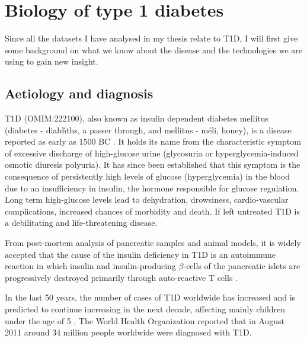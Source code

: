 \section{Biology of type 1 diabetes}

Since all the datasets I have analysed in my thesis relate to \gls{T1D}, I will first give some background on
what we know about the disease and the technologies we are using to gain new insight.

\subsection{Aetiology and diagnosis}

\Gls{T1D} (OMIM:222100), also known as insulin dependent diabetes mellitus (diabetes - \foreignlanguage{greek}{diab\'hths},
a passer through, and mellitus - \foreignlanguage{greek}{m\'eli}, honey), is a disease reported as early as $1500$ BC \citep{Poretsky:2010wr}.
It holds its name from the characteristic symptom of excessive discharge of high-glucose urine (glycosuria or hyperglycemia-induced osmotic diuresis polyuria).
It has since been established that this symptom is the consequence of persistently high levels of glucose (hyperglycemia) in the blood due to an insufficiency in insulin,
the hormone responsible for glucose regulation.
Long term high-glucose levels lead to dehydration, drowsiness, cardio-vascular complications, increased chances of morbidity and death.  
If left untreated T1D is a debilitating and life-threatening disease.

From post-mortem analysis of pancreatic samples and animal models,
it is widely accepted that the cause of the insulin deficiency in \gls{T1D} is an autoimmune reaction
in which insulin and insulin-producing $\beta$-cells of the pancreatic islets
are progressively destroyed primarily through auto-reactive T cells \citep{Todd:2010bl}.  

In the last 50 years, the number of cases of T1D worldwide has increased and is predicted to continue increasing in the next decade,
affecting mainly children under the age of 5 \citep{Patterson:2009gj}.
The World Health Organization reported that in August 2011 around 34 million people worldwide were diagnosed with T1D.


